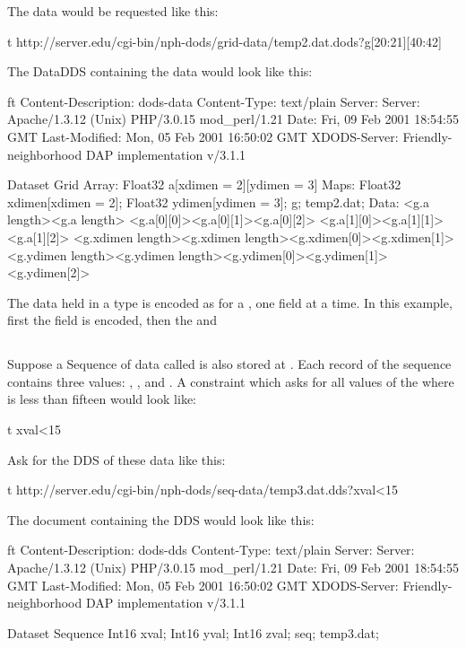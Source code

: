 \documentclass[justify]{nasa-ese}
\begin{document}
The data would be requested like this:

\begin{vcode}{t}
http://server.edu/cgi-bin/nph-dods/grid-data/temp2.dat.dods?g[20:21][40:42]
\end{vcode}

The DataDDS containing the data would look like this:

\begin{vcode}{ft}
Content-Description: dods-data
Content-Type: text/plain
Server: Server: Apache/1.3.12 (Unix)  PHP/3.0.15 mod_perl/1.21
Date: Fri, 09 Feb 2001 18:54:55 GMT
Last-Modified: Mon, 05 Feb 2001 16:50:02 GMT
XDODS-Server: Friendly-neighborhood DAP implementation v/3.1.1

Dataset {
  Grid {
    Array:
      Float32 a[xdimen = 2][ydimen = 3]
    Maps:
      Float32 xdimen[xdimen = 2];
      Float32 ydimen[ydimen = 3];
  } g;
} temp2.dat;
Data:
<g.a length><g.a length>
<g.a[0][0]><g.a[0][1]><g.a[0][2]>
<g.a[1][0]><g.a[1][1]><g.a[1][2]>
<g.xdimen length><g.xdimen length><g.xdimen[0]><g.xdimen[1]>
<g.ydimen length><g.ydimen length><g.ydimen[0]><g.ydimen[1]>
<g.ydimen[2]>
\end{vcode}

The data held in a \Grid type is encoded as for a \Structure, one field at a
time. In this example, first the  field is encoded, then the
 and 

\subsection{\Sequence}

Suppose a Sequence of data called  is also stored at
. Each record of the sequence contains three values:
, , and . A constraint which asks for
all values of the \Sequence where  is less than fifteen
would look like:

\begin{vcode}{t}
xval<15
\end{vcode}

Ask for the DDS of these data like this:

\begin{vcode}{t}
http://server.edu/cgi-bin/nph-dods/seq-data/temp3.dat.dds?xval<15
\end{vcode}

The document containing the DDS would look like this:

\begin{vcode}{ft}
Content-Description: dods-dds
Content-Type: text/plain
Server: Server: Apache/1.3.12 (Unix)  PHP/3.0.15 mod_perl/1.21
Date: Fri, 09 Feb 2001 18:54:55 GMT
Last-Modified: Mon, 05 Feb 2001 16:50:02 GMT
XDODS-Server: Friendly-neighborhood DAP implementation v/3.1.1

Dataset {
  Sequence {
    Int16 xval;
    Int16 yval;
    Int16 zval;
  } seq;
} temp3.dat;
\end{vcode}
\end{document}
